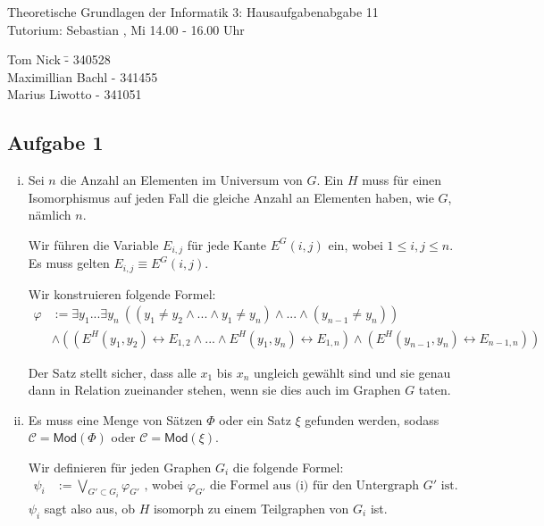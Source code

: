 \documentclass[a4paper,10pt]{article}
\begin{document}
\begin{center}
\Large{Theoretische Grundlagen der Informatik 3: Hausaufgabenabgabe 11} \\
\large{Tutorium: Sebastian , Mi 14.00 - 16.00 Uhr}
\end{center}
\begin{tabbing}
Tom Nick \hspace{2cm}\= - 340528\\
Maximillian Bachl \> - 341455 \\
Marius Liwotto\> -  341051
\end{tabbing}
\subsection*{Aufgabe 1}
\begin{enumerate}[(i)]
\item
Sei $n$ die Anzahl an Elementen im Universum von $G$. Ein $H$ muss für einen Isomorphismus auf jeden Fall die gleiche Anzahl an Elementen haben, wie $G$, nämlich $n$.

Wir führen die Variable $E_{i,j}$ für jede Kante $E^G(i,j)$ ein, wobei $1\le i,j \le n$. Es muss gelten $E_{i,j} \equiv E^G(i,j)$.

Wir konstruieren folgende Formel: 
\begin{align*}
\varphi &:= \exists y_1 ... \exists y_n~ \left(\left(y_1 \neq y_2 \land ... \land  y_1 \neq y_n\right) \land ... \land \left(y_{n-1} \neq y_n\right)\right) \\
&\land \left(\left( E^H(y_1,y_2) \leftrightarrow E_{1,2} \land ... \land E^H(y_1,y_n) \leftrightarrow E_{1,n} \right) \land \left( E^H(y_{n-1},y_n) \leftrightarrow E_{n-1,n} \right) \right)
\end{align*}

Der Satz stellt sicher, dass alle $x_1$ bis $x_n$ ungleich gewählt sind und sie genau dann in Relation zueinander stehen, wenn sie dies auch im Graphen $G$ taten.
\item
Es muss eine Menge von Sätzen $\Phi$ oder ein Satz $\xi$ gefunden werden, sodass $\mathcal C = \textsf{Mod}(\Phi)$ oder $\mathcal C = \textsf{Mod}(\xi)$.

Wir definieren für jeden Graphen $G_i$ die folgende Formel:
\begin{align*}
\psi_i &:= \bigvee_{G' \subset G_i} \varphi_{G'} \text{ , wobei $\varphi_{G'}$ die Formel aus (i) für den Untergraph $G'$ ist.}
\end{align*}
$\psi_i$ sagt also aus, ob $H$ isomorph zu einem Teilgraphen von $G_i$ ist.


\end{enumerate}
\end{document}
